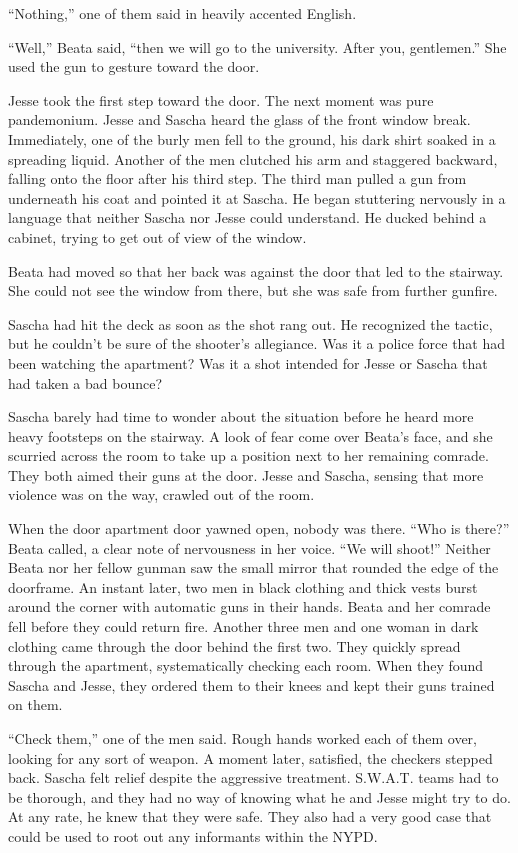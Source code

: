 \documentclass[12pt]{book}
\begin{document}
``Nothing,'' one of them said in heavily accented English.

``Well,'' Beata said, ``then we will go to the university.  After you, gentlemen.''  She used the gun to gesture toward the door.

Jesse took the first step toward the door.  The next moment was pure pandemonium.  Jesse and Sascha heard the glass of the front window break.  Immediately, one of the burly men fell to the ground, his dark shirt soaked in a spreading liquid.  Another of the men clutched his arm and staggered backward, falling onto the floor after his third step.  The third man pulled a gun from underneath his coat and pointed it at Sascha.  He began stuttering nervously in a language that neither Sascha nor Jesse could understand.  He ducked behind a cabinet, trying to get out of view of the window.

Beata had moved so that her back was against the door that led to the stairway.  She could not see the window from there, but she was safe from further gunfire.

Sascha had hit the deck as soon as the shot rang out.  He recognized the tactic, but he couldn't be sure of the shooter's allegiance.  Was it a police force that had been watching the apartment?  Was it a shot intended for Jesse or Sascha that had taken a bad bounce?

Sascha barely had time to wonder about the situation before he heard more heavy footsteps on the stairway.  A look of fear come over Beata's face, and she scurried across the room to take up a position next to her remaining comrade.  They both aimed their guns at the door.  Jesse and Sascha, sensing that more violence was on the way, crawled out of the room.

When the door apartment door yawned open, nobody was there.  ``Who is there?'' Beata called, a clear note of nervousness in her voice.  ``We will shoot!''  Neither Beata nor her fellow gunman saw the small mirror that rounded the edge of the doorframe.  An instant later, two men in black clothing and thick vests burst around the corner with automatic guns in their hands.  Beata and her comrade fell before they could return fire.  Another three men and one woman in dark clothing came through the door behind the first two.  They quickly spread through the apartment, systematically checking each room.  When they found Sascha and Jesse, they ordered them to their knees and kept their guns trained on them.

``Check them,'' one of the men said.  Rough hands worked each of them over, looking for any sort of weapon.  A moment later, satisfied, the checkers stepped back.  Sascha felt relief despite the aggressive treatment.  S.W.A.T. teams had to be thorough, and they had no way of knowing what he and Jesse might try to do.  At any rate, he knew that they were safe.  They also had a very good case that could be used to root out any informants within the NYPD.
\end{document}

